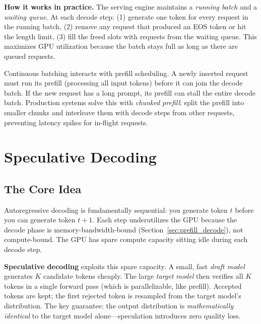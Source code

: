 \textbf{How it works in practice.} The serving engine maintains a \textit{running batch} and a \textit{waiting queue}. At each decode step: (1) generate one token for every request in the running batch, (2) remove any request that produced an EOS token or hit the length limit, (3) fill the freed slots with requests from the waiting queue. This maximizes GPU utilization because the batch stays full as long as there are queued requests.

\begin{warningbox}
Continuous batching interacts with prefill scheduling. A newly inserted request must run its prefill (processing all input tokens) before it can join the decode batch. If the new request has a long prompt, its prefill can stall the entire decode batch. Production systems solve this with \textit{chunked prefill}: split the prefill into smaller chunks and interleave them with decode steps from other requests, preventing latency spikes for in-flight requests.
\end{warningbox}

\section{Speculative Decoding}
\label{sec:speculative_decoding}

\subsection{The Core Idea}

Autoregressive decoding is fundamentally sequential: you generate token $t$ before you can generate token $t+1$. Each step underutilizes the GPU because the decode phase is memory-bandwidth-bound (Section~\ref{sec:prefill_decode}), not compute-bound. The GPU has spare compute capacity sitting idle during each decode step.

\textbf{Speculative decoding} exploits this spare capacity. A small, fast \textit{draft model} generates $K$ candidate tokens cheaply. The large \textit{target model} then verifies all $K$ tokens in a single forward pass (which is parallelizable, like prefill). Accepted tokens are kept; the first rejected token is resampled from the target model's distribution. The key guarantee: the output distribution is \textit{mathematically identical} to the target model alone---speculation introduces zero quality loss.

